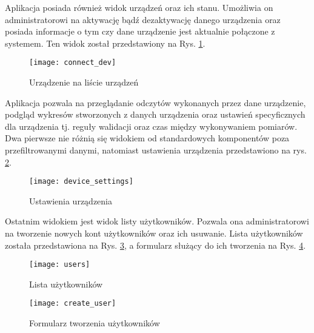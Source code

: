 Aplikacja posiada również widok urządzeń oraz ich stanu. Umożliwia on administratorowi
na aktywację bądź dezaktywację danego urządzenia oraz posiada informacje o tym czy 
dane urządzenie jest aktualnie połączone z systemem.
Ten widok został przedstawiony na Rys. \ref{device_list}.
\begin{figure}[h!]
  \centering
  \texttt{[image: connect\_dev]}
  \caption{Urządzenie na liście urządzeń}
  \label{device_list}
\end{figure}
Aplikacja pozwala na przeglądanie odczytów wykonanych przez dane urządzenie, podgląd wykresów
stworzonych z danych urządzenia oraz ustawień specyficznych dla urządzenia tj. reguły walidacji
oraz czas między wykonywaniem pomiarów. Dwa pierwsze nie różnią się widokiem od standardowych 
komponentów poza przefiltrowanymi danymi, natomiast ustawienia urządzenia przedstawiono na 
rys. \ref{atmosphere:device_settings}.
\begin{figure}[h!]
  \centering
  \texttt{[image: device\_settings]}
  \caption{Ustawienia urządzenia}
  \label{atmosphere:device_settings}
\end{figure}

Ostatnim widokiem jest widok listy użytkowników. Pozwala ona administratorowi na tworzenie
nowych kont użytkowników oraz ich usuwanie. Lista użytkowników została przedstawiona
na Rys. \ref{users}, a formularz służący do ich tworzenia na Rys. \ref{create_user}.
\begin{figure}[h!]
  \centering
  \texttt{[image: users]}
  \caption{Lista użytkowników}
  \label{users}
\end{figure}
\begin{figure}[h!]
  \centering
  \texttt{[image: create\_user]}
  \caption{Formularz tworzenia użytkowników}
  \label{create_user}
\end{figure}
